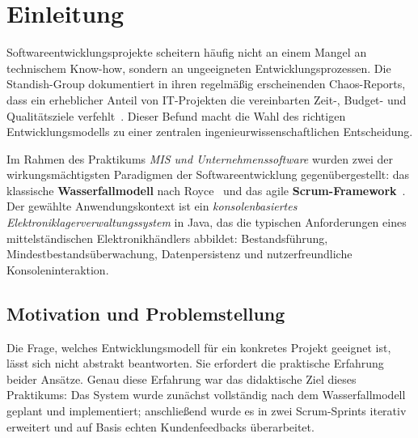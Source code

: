 \documentclass[12pt, a4paper, twoside]{report}
\begin{document}
\cleardoublepage
\tableofcontents

\cleardoublepage
\listoffigures
{}

\cleardoublepage
\listoftables
{}

\cleardoublepage
\chapter{Einleitung}
\label{chap:einleitung}

Softwareentwicklungsprojekte scheitern häufig nicht an einem Mangel an technischem Know-how,
sondern an ungeeigneten Entwicklungsprozessen. Die Standish-Group dokumentiert in ihren
regelmäßig erscheinenden Chaos-Reports, dass ein erheblicher Anteil von IT-Projekten die
vereinbarten Zeit-, Budget- und Qualitätsziele verfehlt~\autocite{standish2020}.
Dieser Befund macht die Wahl des richtigen Entwicklungsmodells zu einer zentralen
ingenieurwissenschaftlichen Entscheidung.

Im Rahmen des Praktikums \textit{MIS und Unternehmenssoftware} wurden zwei der wirkungsmächtigsten
Paradigmen der Softwareentwicklung gegenübergestellt: das klassische \textbf{Wasserfallmodell}
nach Royce~\autocite{royce1970} und das agile \textbf{Scrum-Framework}~\autocite{schwaber2020}.
Der gewählte Anwendungskontext ist ein \textit{konsolenbasiertes Elektroniklagerverwaltungssystem}
in Java, das die typischen Anforderungen eines mittelständischen Elektronikhändlers abbildet:
Bestandsführung, Mindestbestandsüberwachung, Datenpersistenz und nutzerfreundliche
Konsoleninteraktion.

\section{Motivation und Problemstellung}

Die Frage, welches Entwicklungsmodell für ein konkretes Projekt geeignet ist, lässt sich nicht
abstrakt beantworten. Sie erfordert die praktische Erfahrung beider Ansätze. Genau diese
Erfahrung war das didaktische Ziel dieses Praktikums: Das System wurde zunächst vollständig
nach dem Wasserfallmodell geplant und implementiert; anschließend wurde es in zwei Scrum-Sprints
iterativ erweitert und auf Basis echten Kundenfeedbacks überarbeitet.
\end{document}
